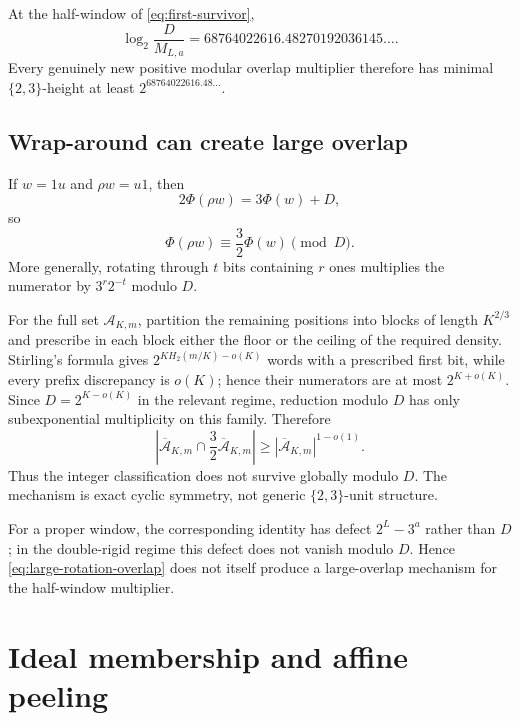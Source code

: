 \documentclass[11pt]{amsart}
\numberwithin{equation}{section}
\newcommand{\A}{\mathcal A}
\begin{document}
At the half-window of \eqref{eq:first-survivor},
\begin{equation}\label{eq:no-wrap-first}
\log_2\frac{D}{M_{L,a}}
=68764022616.48270192036145\ldots.
\end{equation}
Every genuinely new positive modular overlap multiplier therefore has minimal $\{2,3\}$-height at least $2^{68764022616.48\ldots}$.

\subsection{Wrap-around can create large overlap}

If $w=1u$ and $\rho w=u1$, then
\begin{equation}\label{eq:rotation-3over2}
2\Phi(\rho w)=3\Phi(w)+D,
\end{equation}
so
\begin{equation}\label{eq:rotation-mod}
\Phi(\rho w)\equiv\frac32\Phi(w)\pmod D.
\end{equation}
More generally, rotating through $t$ bits containing $r$ ones multiplies the numerator by $3^r2^{-t}$ modulo $D$.

For the full set $\A_{K,m}$, partition the remaining positions into blocks of length $K^{2/3}$ and prescribe in each block either the floor or the ceiling of the required density.  Stirling's formula gives $2^{K H_2(m/K)-o(K)}$ words with a prescribed first bit, while every prefix discrepancy is $o(K)$; hence their numerators are at most $2^{K+o(K)}$.  Since $D=2^{K-o(K)}$ in the relevant regime, reduction modulo $D$ has only subexponential multiplicity on this family.  Therefore
\begin{equation}\label{eq:large-rotation-overlap}
\left|
\overline{\A}_{K,m}
\cap\frac32\overline{\A}_{K,m}
\right|
\ge
|\overline{\A}_{K,m}|^{1-o(1)}.
\end{equation}
Thus the integer classification does not survive globally modulo $D$.  The mechanism is exact cyclic symmetry, not generic $\{2,3\}$-unit structure.

For a proper window, the corresponding identity has defect $2^L-3^a$ rather than $D$; in the double-rigid regime this defect does not vanish modulo $D$.  Hence \eqref{eq:large-rotation-overlap} does not itself produce a large-overlap mechanism for the half-window multiplier.

\section{Ideal membership and affine peeling}\label{sec:ideal}
\end{document}
